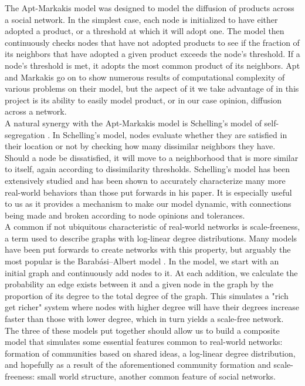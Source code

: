 \documentclass[10pt]{article}
\begin{document}
The Apt-Markakis model \cite{apt2011diffusion} was designed to model the diffusion of products across a social network. In the simplest case, each node is initialized to have either adopted a product, or a threshold at which it will adopt one. The model then continuously checks nodes that have not adopted products to see if the fraction of its neighbors that have adopted a given product exceeds the node's threshold. If a node's threshold is met, it adopts the most common product of its neighbors. Apt and Markakis go on to show numerous results of computational complexity of various problems on their model, but the aspect of it we take advantage of in this project is its ability to easily model product, or in our case opinion, diffusion across a network. \\

A natural synergy with the Apt-Markakis model is Schelling's model of self-segregation \cite{schelling1971dynamic}. In Schelling's model, nodes evaluate whether they are satisfied in their location or not by checking how many dissimilar neighbors they have. Should a node be dissatisfied, it will move to a neighborhood that is more similar to itself, again according to dissimilarity thresholds. Schelling's model has been extensively studied and has been shown to accurately characterize many more real-world behaviors than those put forwards in his paper. It is especially useful to us as it provides a mechanism to make our model dynamic, with connections being made and broken according to node opinions and tolerances. \\

A common if not ubiquitous characteristic of real-world networks is scale-freeness, a term used to describe graphs with log-linear degree distributions. Many models have been put forwards to create networks with this property, but arguably the most popular is the Barabási–Albert model \cite{barabasi1999emergence}. In the model, we start with an initial graph and continuously add nodes to it. At each addition, we calculate the probability an edge exists between it and a given node in the graph by the proportion of its degree to the total degree of the graph. This simulates a "rich get richer" system where nodes with higher degree will have their degrees increase faster than those with lower degree, which in turn yields a scale-free network. \\

The three of these models put together should allow us to build a composite model that simulates some essential features common to real-world networks: formation of communities based on shared ideas, a log-linear degree distribution, and hopefully as a result of the aforementioned community formation and scale-freeness: small world structure, another common feature of social networks. \\
\end{document}
